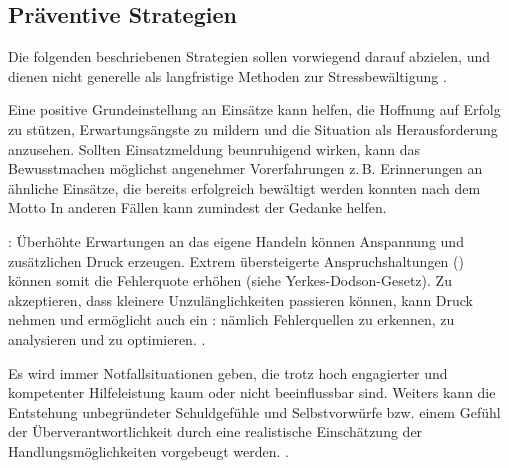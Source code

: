 \subsection{Präventive Strategien}


Die folgenden beschriebenen Strategien sollen  vorwiegend
darauf abzielen,  und dienen nicht generelle als langfristige Methoden zur
Stressbewältigung \cite{Karutz200912}.


{Eine positive Grundeinstellung an Einsätze
kann helfen, die Hoffnung auf Erfolg zu stützen,
Erwartungsängste zu mildern und die Situation als
Herausforderung anzusehen. Sollten Einsatzmeldung
beunruhigend wirken, kann das Bewusstmachen möglichst angenehmer
Vorerfahrungen z.\,B. Erinnerungen an ähnliche Einsätze, die
bereits erfolgreich bewältigt werden konnten nach dem Motto
 In anderen Fällen
kann zumindest der Gedanke  helfen.

: Überhöhte Erwartungen
an das eigene Handeln können Anspannung und zusätzlichen
Druck erzeugen. Extrem übersteigerte Anspruchshaltungen
() können
somit die Fehlerquote erhöhen (siehe Yerkes-Dodson-Gesetz). Zu
akzeptieren, dass kleinere Unzulänglichkeiten passieren
können, kann Druck nehmen und ermöglicht auch ein
: nämlich Fehlerquellen zu erkennen,
zu analysieren und zu optimieren. .

Es wird immer Notfallsituationen geben, die trotz hoch engagierter und
kompetenter Hilfeleistung kaum oder nicht beeinflussbar
sind. Weiters kann die Entstehung unbegründeter
Schuldgefühle und Selbstvorwürfe bzw. einem Gefühl der
Überverantwortlichkeit durch eine realistische Einschätzung
der Handlungsmöglichkeiten vorgebeugt werden.
.}
{}
{}
{}
{}


